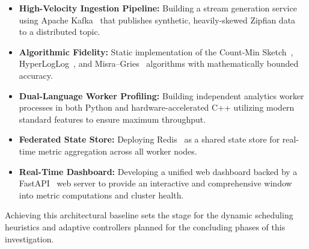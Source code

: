 \begin{itemize}
    \item \textbf{High-Velocity Ingestion Pipeline:} Building a stream generation service using Apache Kafka~\cite{kafka} that publishes synthetic, heavily-skewed Zipfian data~\cite{zipf} to a distributed topic.
    \item \textbf{Algorithmic Fidelity:} Static implementation of the Count-Min Sketch~\cite{cms}, HyperLogLog~\cite{hll}, and Misra--Gries~\cite{misra} algorithms with mathematically bounded accuracy.
    \item \textbf{Dual-Language Worker Profiling:} Building independent analytics worker processes in both Python and hardware-accelerated C++ utilizing modern standard features to ensure maximum throughput.
    \item \textbf{Federated State Store:} Deploying Redis~\cite{redis} as a shared state store for real-time metric aggregation across all worker nodes.
    \item \textbf{Real-Time Dashboard:} Developing a unified web dashboard backed by a FastAPI~\cite{fastapi} web server to provide an interactive and comprehensive window into metric computations and cluster health.
\end{itemize}

Achieving this architectural baseline sets the stage for the dynamic scheduling heuristics and adaptive controllers planned for the concluding phases of this investigation.
